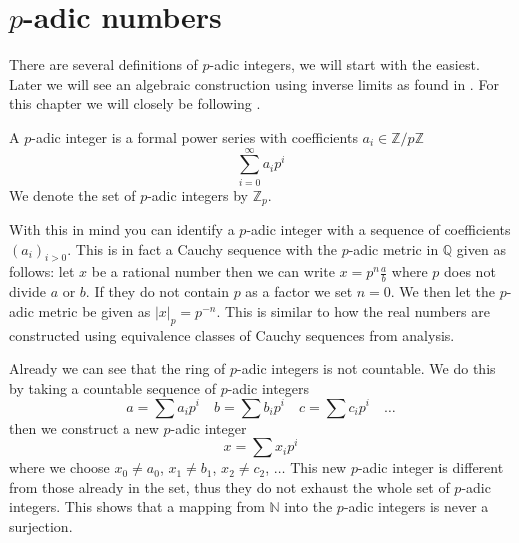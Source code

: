 \section{$p$-adic numbers} \label{p-adic}
There are several definitions of $p$-adic integers, we will start with the easiest. Later we
will see an algebraic construction using inverse limits as found in \cite{Rotman}. For this
chapter we will closely be following \cite{Robert}.
\begin{mydef}
 A $p$-adic integer is a formal power series with coefficients $a_i \in \mathbb{Z}/p\mathbb{Z}$
$$ \sum_{i=0}^{\infty} a_i p^i $$
We denote the set of $p$-adic integers by $\mathbb{Z}_p$.
\end{mydef}
With this in mind you can identify a $p$-adic integer with a sequence of coefficients
$(a_i)_{i > 0}$. This is in fact a Cauchy sequence with the $p$-adic metric in $\mathbb{Q}$ given as follows:
let $x$ be a rational number then we can write $x = p^n \frac{a}{b}$ where $p$ does not divide $a$ or $b$.
If they do not contain $p$ as a factor we set $n=0$. We then let the $p$-adic metric be given as
$|x|_p = p^{-n}$. This is similar to how the real numbers are constructed using equivalence classes
of Cauchy sequences from analysis.

Already we can see that the ring of $p$-adic integers is not countable. We do this by taking
a countable sequence of $p$-adic integers
$$a = \sum a_i p^i \quad b = \sum b_i p^i \quad c = \sum c_i p^i \quad \ldots $$
then we construct a new $p$-adic integer
$$x = \sum x_i p^i $$
where we choose $x_0 \neq a_0$, $x_1 \neq b_1$, $x_2 \neq c_2$, $\ldots$
This new $p$-adic integer is different from those already in the set, thus they do not
exhaust the whole set of $p$-adic integers. This shows that a mapping from $\mathbb{N}$ into
the $p$-adic integers is never a surjection.

